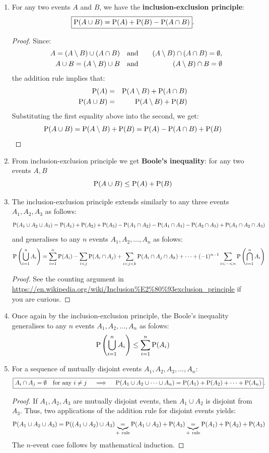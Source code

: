 \begin{enumerate}
\item For any two events $A$ and $B$, we have the {\bf inclusion-exclusion principle}:
\[
\boxed{
\P(A \cup B) = \P(A) + \P(B) - \P(A \cap B)
}.
\]
{\scriptsize
\begin{proof}
Since: 
\begin{eqnarray}
\quad A = (A \setminus B) \cup (A \cap B) & \quad \text{and} \quad & (A \setminus B) \cap (A \cap B) = \emptyset, \notag \\
\quad A \cup B = (A \setminus B) \cup B & \quad \text{and} \quad & (A \setminus B) \cap B = \emptyset \notag
\end{eqnarray}
the addition rule implies that:
\begin{eqnarray}
\P(A) &=& \P(A \setminus B) + \P(A \cap B) \notag \\
\P(A \cup B) &=& \P(A \setminus B) + \P(B) \notag
\end{eqnarray}
Substituting the first equality above into the second, we get:
\[
\P(A \cup B) = \P(A \setminus B) + \P(B) = \P(A) - \P(A \cap B) + \P(B)
\]
\end{proof}
}
\item From inclusion-exclusion principle we get {\bf Boole's inequality}: for any two events $A, B$
\[
\P(A \cup B) \leq \P(A) + \P(B)
\]
\item The inclusion-exclusion principle extends similarly to any three events $A_1,A_2,A_3$ as follows:
\[
\P(A_1 \cup A_2 \cup A_3) = \P(A_1) + \P(A_2) + \P(A_3) - \P(A_1 \cap A_2) - \P(A_1 \cap A_3) - \P(A_2 \cap A_3) + \P(A_1 \cap A_2 \cap A_3)
\]
and generalises to any $n$ events $A_1,A_2,\ldots,A_n$ as folows:
\[
\P \left( \bigcup_{i=1}^n A_i \right) = \sum_{i=1}^n \P(A_i) - \sum_{i<j} \P(A_i \cap A_j) + \sum_{i<j<k} \P(A_i \cap A_j \cap A_k) + \cdots + (-1)^{n-1} \sum_{i< \cdots <n} \P \left( \bigcap_{i=1}^n A_i \right)
\]

{\scriptsize
\begin{proof} See the counting argument in \url{https://en.wikipedia.org/wiki/Inclusion\%E2\%80\%93exclusion_principle} if you are curious.
\end{proof}
}  
\item Once again by the inclusion-exclusion principle, the Boole's inequality generalises to any $n$ events $A_1,A_2,\ldots,A_n$ as folows:
\[
\P \left( \bigcup_{i=1}^n A_i \right) \leq \sum_{i=1}^n \P(A_i)
\]
\item For a sequence of mutually disjoint events $A_1, A_2, A_3, \ldots, A_n$: 
\[
\boxed{
A_i \cap A_j = \emptyset \quad \text{for any $i \neq j$} \quad \implies \quad \P(A_1 \cup A_2 \cup \cdots \cup A_n) = \P(A_1)+\P(A_2)+ \cdots + \P(A_n)} .
\]
{\scriptsize
\begin{proof}
If $A_1, A_2, A_3$ are mutually disjoint events, then $A_1 \cup A_2$ is disjoint from $A_3$.  Thus, two applications of the addition rule for disjoint events yields:
\[
\P(A_1 \cup A_2 \cup A_3) = \P((A_1 \cup A_2) \cup A_3) \underbrace{=}_{+~\text{rule}} \P(A_1 \cup A_2) + \P(A_3) \underbrace{=}_{+~\text{rule}}  \P(A_1) + \P(A_2) + \P(A_3)
\]
The $n$-event case follows by mathematical induction.
\end{proof}
}
\end{enumerate}

